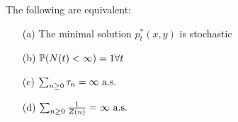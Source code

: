 \begin{theorem}\label{thm:1.24}
    The following are equivalent:
    \begin{enumerate}
        \item[(a)] The minimal solution \(p_t^*(x,y)\) is stochastic
        \item[(b)] \(\mathbb{P}(N(t)<\infty)=1\forall t\)
        \item[(c)] \(\sum_{n\geq 0}\tau_n=\infty\text{ a.s. }\)
        \item[(d)] \(\sum_{n\geq 0}\frac{1}{Z(n)}=\infty\text{ a.s. }\)    
    \end{enumerate}
\end{theorem}
